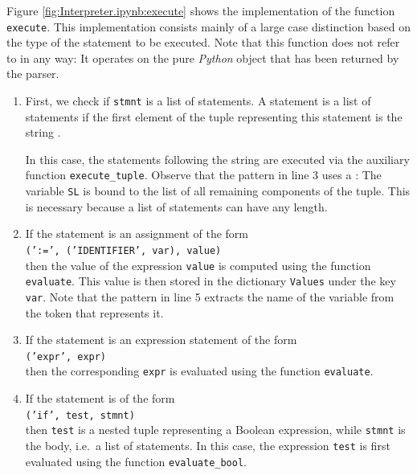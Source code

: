 Figure \ref{fig:Interpreter.ipynb:execute} shows the implementation of the function \texttt{execute}.  This
implementation consists mainly of a large case distinction based on the type of the statement to be
executed.  Note that this function does not refer to  in any way:  It operates on the pure
\textsl{Python} object that has been returned by the parser.
\begin{enumerate}
\item First, we check if \texttt{stmnt} is a list of statements.  A statement is a list of statements
      if the first element of the tuple representing this statement is the string .

      In this case, the statements following the string  are executed via the auxiliary
      function \texttt{execute\_tuple}.  Observe that the pattern in line 3 uses a
      :  The variable \texttt{SL} is bound to the list of
      all remaining components of the tuple.  This is necessary because a list of statements can have any
      length.
\item If the statement is an assignment of the form
      \\[0.2cm]
      \hspace*{1.3cm}
      \texttt{(':=', ('IDENTIFIER', var), value)}
      \\[0.2cm]
      then the value of the expression \texttt{value} is computed using the function \texttt{evaluate}.
      This value is then stored in the dictionary \texttt{Values} under the key \texttt{var}.  Note that the
      pattern in line 5 extracts the name of the variable from the token that represents it.
\item If the statement is an expression statement of the form
      \\[0.2cm]
      \hspace*{1.3cm}
      \texttt{('expr', expr)}
      \\[0.2cm]
      then the corresponding \texttt{expr} is evaluated using the function \texttt{evaluate}.
\item If the statement is of the form
      \\[0.2cm]
      \hspace*{1.3cm}
      \texttt{('if', test, stmnt)}
      \\[0.2cm]
      then \texttt{test} is a nested tuple representing a Boolean expression, while \texttt{stmnt} is the body,
      i.e.~a list of statements.
      In this case, the expression \texttt{test} is first evaluated using the function \texttt{evaluate\_bool}.

\end{enumerate}
